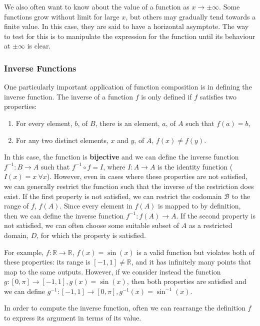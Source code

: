 \documentclass[11pt,titlepage]{article}
\numberwithin{equation}{section}
\begin{document}
We also often want to know about the value of a function as $x\rightarrow\pm\infty$. Some functions grow without limit for large $x$, but others may gradually tend towards a finite value. In this case, they are said to have a horizontal asymptote. The way to test for this is to manipulate the expression for the function until its behaviour at $\pm\infty$ is clear. 

\subsubsection{Inverse Functions}

One particularly important application of function composition is in defining the inverse function. The inverse of a function $f$ is only defined if $f$ satisfies two properties:

\begin{enumerate}
    \item For every element, $b$, of $B$, there is an element, $a$, of $A$ such that $f(a) = b$,
    \item For any two distinct elements, $x$ and $y$, of $A$, $f(x) \neq f(y)$.
\end{enumerate}

In this case, the function is \textbf{bijective} and we can define the inverse function $f^{-1}:B\to A$ such that $f^{-1}\circ f = I$, where $I:A\to A$ is the identity function ($I(x) = x\ \forall x$). However, even in cases where these properties are not satisfied, we can generally restrict the function such that the inverse of the restriction does exist. If the first property is not satisfied, we can restrict the codomain $\mathcal{B}$ to the range of $f$, $f(A)$. Since every element in $f(A)$ is mapped to by definition, then we can define the inverse function $f^{-1}:f(A)\to A$. If the second property is not satisfied, we can often choose some suitable subset of $A$ as a restricted domain, $D$, for which the property is satisfied.

For example, $f:\mathbb{R}\rightarrow\mathbb{R}$, $f(x) = \sin(x)$ is a valid function but violates both of these properties: its range is $[-1,1] \neq \mathbb{R}$, and it has infinitely many points that map to the same outputs. However, if we consider instead the function $g:[0,\pi]\rightarrow[-1,1], g(x) = \sin(x)$, then both properties are satisfied and we can define $g^{-1}:[-1,1]\rightarrow[0,\pi], g^{-1}(x) = \sin^{-1}(x)$.

In order to compute the inverse function, often we can rearrange the definition $f$ to express its argument in terms of its value.
\end{document}

